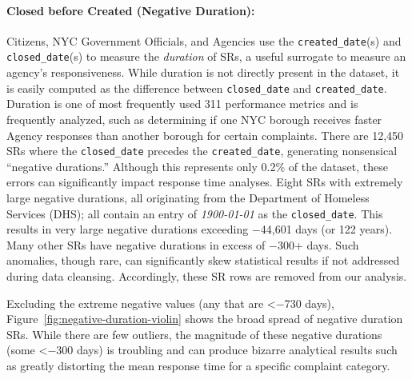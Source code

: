\documentclass[linenumber]{jdsart}
\begin{document}
\paragraph{Closed before Created (Negative Duration):}
Citizens, NYC Government Officials, and Agencies use the \texttt{created\_date}(s) and 
\texttt{closed\_date}(s) to measure the \textit{duration} of SRs, 
a useful surrogate to measure an agency's responsiveness. 
While duration is not directly present in the dataset, 
it is easily computed as the difference between
\texttt{closed\_date} and \texttt{created\_date}.  Duration is one of 
most frequently used 311 performance metrics 
and is frequently analyzed, such as determining if 
one NYC borough receives faster Agency responses than 
another borough for certain complaints. There are 
12,450 SRs where the \texttt{closed\_date} precedes the 
\texttt{created\_date}, generating nonsensical ``negative durations.'' 
Although this represents only 0.2\% of the dataset, these errors can 
significantly impact response time analyses. Eight SRs with extremely 
large negative durations, all originating from the 
Department of Homeless Services (DHS); all contain an entry 
of \textit{1900-01-01} as the \texttt{closed\_date}. This results 
in very large negative durations exceeding $-$44,601 
days (or 122 years). Many other SRs have negative durations 
in excess of $-$300+ days. Such anomalies, though rare, can 
significantly skew statistical results if not addressed during 
data cleansing. Accordingly, these SR rows are removed from our analysis. 

Excluding the extreme negative values (any that are <$-$730 days), 
Figure~\ref{fig:negative-duration-violin} shows the broad spread of 
negative duration SRs. While there are few outliers, the magnitude 
of these negative durations (some <$-$300 days) is troubling 
and can produce bizarre analytical results such as greatly 
distorting the mean response time for a specific complaint category.
\end{document}
